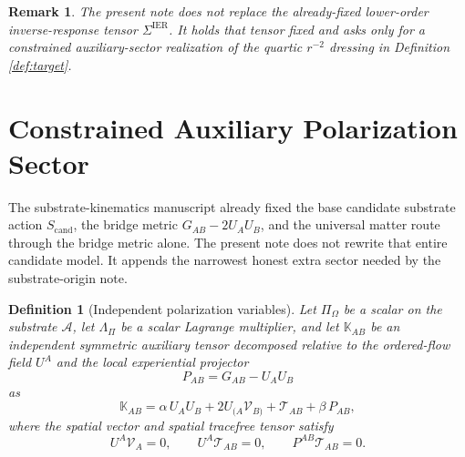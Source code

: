 \documentclass[11pt]{article}
\newcommand{\Sub}{\mathcal{A}}
\newcommand{\ProjSub}{P}
\newcommand{\BalanceField}{\Pi_\Omega}
\newcommand{\BalMult}{\Lambda_\Pi}
\newcommand{\SigmaIER}{\Sigma^{\mathrm{IER}}}
\newcommand{\AuxPol}{\mathbb K}
\newcommand{\CandAction}{S_{\mathrm{cand}}}
\newtheorem{definition}{Definition}
\newtheorem{remark}{Remark}
\begin{document}
\begin{remark}
The present note does not replace the already-fixed lower-order inverse-response tensor \(\SigmaIER\). It holds that tensor fixed and asks only for a constrained auxiliary-sector realization of the quartic \(r^{-2}\) dressing in Definition \ref{def:target}.
\end{remark}

\section{Constrained Auxiliary Polarization Sector}

The substrate-kinematics manuscript already fixed the base candidate substrate action \(\CandAction\), the bridge metric \(G_{AB}-2U_AU_B\), and the universal matter route through the bridge metric alone. The present note does not rewrite that entire candidate model. It appends the narrowest honest extra sector needed by the substrate-origin note.

\begin{definition}[Independent polarization variables]
\label{def:decomp}
Let \(\BalanceField\) be a scalar on the substrate \(\Sub\), let \(\BalMult\) be a scalar Lagrange multiplier, and let \(\AuxPol_{AB}\) be an independent symmetric auxiliary tensor decomposed relative to the ordered-flow field \(U^A\) and the local experiential projector
\begin{equation}
\ProjSub_{AB}=G_{AB}-U_AU_B
\label{eq:projector}
\end{equation}
as
\begin{equation}
\AuxPol_{AB}
=
\alpha\,U_AU_B
+2U_{(A}\mathcal V_{B)}
+\mathcal T_{AB}
+\beta\,\ProjSub_{AB},
\label{eq:Kdecomp}
\end{equation}
where the spatial vector and spatial tracefree tensor satisfy
\begin{equation}
U^A\mathcal V_A=0,
\qquad
U^A\mathcal T_{AB}=0,
\qquad
\ProjSub^{AB}\mathcal T_{AB}=0.
\label{eq:TVcond}
\end{equation}
\end{definition}
\end{document}
